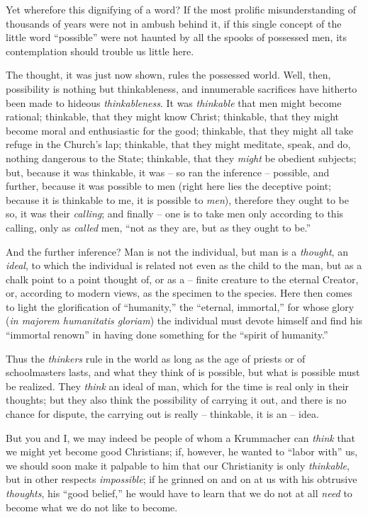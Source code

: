 \documentclass[12pt,a4paper]{book}
\begin{document}
Yet wherefore this dignifying of a word? If the most prolific misunderstanding 
of thousands of years were not in ambush behind it, if this single concept of 
the little word ``possible'' were not haunted by all the spooks of possessed 
men, its contemplation should trouble us little here.

The thought, it was just now shown, rules the possessed world. Well, then, 
possibility is nothing but thinkableness, and innumerable sacrifices have 
hitherto been made to hideous \textit{thinkableness}. It was 
\textit{thinkable} that men might become rational; thinkable, that they might 
know Christ; thinkable, that they might become moral and enthusiastic for the 
good; thinkable, that they might all take refuge in the Church's lap; 
thinkable, that they might meditate, speak, and do, nothing dangerous to the 
State; thinkable, that they \textit{might} be obedient subjects; but, because 
it was thinkable, it was -- so ran the inference -- possible, and further, 
because it was possible to men (right here lies the deceptive point; because 
it is thinkable to me, it is possible to \textit{men}), therefore they ought 
to be so, it was their \textit{calling}; and finally -- one is to take men 
only according to this calling, only as \textit{called} men, ``not as they 
are, but as they ought to be.''

And the further inference? Man is not the individual, but man is a 
\textit{thought}, an \textit{ideal}, to which the individual is related not 
even as the child to the man, but as a chalk point to a point thought of, or 
as a -- finite creature to the eternal Creator, or, according to modern views, 
as the specimen to the species. Here then comes to light the glorification of 
``humanity,'' the ``eternal, immortal,'' for whose glory (\textit{in 
majorem humanitatis gloriam}) the individual must devote himself and find his 
``immortal renown'' in having done something for the ``spirit of 
humanity.''

Thus the \textit{thinkers} rule in the world as long as the age of priests or 
of schoolmasters lasts, and what they think of is possible, but what is 
possible must be realized. They \textit{think} an ideal of man, which for the 
time is real only in their thoughts; but they also think the possibility of 
carrying it out, and there is no chance for dispute, the carrying out is 
really -- thinkable, it is an -- idea.

But you and I, we may indeed be people of whom a Krummacher can \textit{think} 
that we might yet become good Christians; if, however, he wanted to ``labor 
with'' us, we should soon make it palpable to him that our Christianity is 
only \textit{thinkable}, but in other respects \textit{impossible}; if he 
grinned on and on at us with his obtrusive \textit{thoughts}, his ``good 
belief,'' he would have to learn that we do not at all \textit{need} to 
become what we do not like to become.
\end{document}
